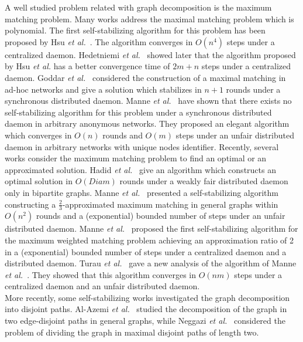 \documentclass[11pt,letterpaper,onecolumn]{article}
\begin{document}
A well studied problem related with graph decomposition is the maximum matching problem. Many works address the maximal matching problem which is polynomial. The first self-stabilizing algorithm for this problem has been proposed by Hsu \emph{et al.}~\cite{HsuH92}. The algorithm converges in $O(n^4)$ steps under a centralized daemon. Hedetniemi \emph{et al.}~\cite{HedetniemiJS01} showed later that the algorithm proposed by Hsu \emph{et al.} has a better convergence time of $2m+n$ steps under a centralized daemon. Goddar \emph{et al.}~\cite{GoddardHJS03} considered the construction of a maximal matching in ad-hoc networks and give a solution which stabilizes in $n+1$ rounds under a synchronous distributed daemon. Manne \emph{et al.}~\cite{ManneMPT09} have shown that there exists no self-stabilizing algorithm for this problem under a synchronous distributed daemon in arbitrary anonymous networks. They proposed an elegant algorithm which converges in $O(n)$ rounds and $O(m)$ steps under an unfair distributed daemon in arbitrary networks with unique nodes identifier. Recently, several works consider the maximum matching problem to find an optimal or an approximated solution. Hadid \emph{et al.}~\cite{HadidK09} give an algorithm which constructs an optimal solution in $O(Diam)$ rounds under a weakly fair distributed daemon only in bipartite graphs. Manne \emph{et al.}~\cite{ManneMPT11} presented a self-stabilizing algorithm constructing a $\frac{2}{3}$-approximated maximum matching in general graphs within $O(n^2)$ rounds and a (exponential) bounded number of steps under an unfair distributed daemon. Manne \emph{et al.}~\cite{ManneM07} proposed the first self-stabilizing algorithm for the maximum weighted matching problem achieving an approximation ratio of 2 in a (exponential) bounded number of steps under a centralized daemon and a distributed daemon. Turau \emph{et al.}~\cite{TurauH11a} gave a new analysis of the algorithm of Manne \emph{et al.}~\cite{ManneM07}. They showed that this algorithm converges in $O(nm)$ steps under a centralized daemon and an unfair distributed daemon.\\
More recently, some self-stabilizing works investigated the graph decomposition into disjoint paths. Al-Azemi \emph{et al.}~\cite{Al-AzemiK11} studied the decomposition of the graph in two edge-disjoint paths in general graphs, while Neggazi \emph{et al.}~\cite{NeggaziHK12b} considered the problem of dividing the graph in maximal disjoint paths of length two.
\end{document}
